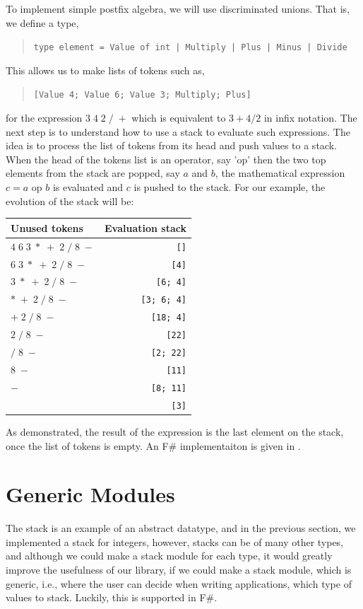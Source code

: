 \documentclass[fsharpNotes.tex]{subfiles}
\begin{document}
To implement simple postfix algebra, we will use discriminated unions. That is, we define a type,
\begin{quote}
\lstinline{type element = Value of int | Multiply | Plus | Minus | Divide}
\end{quote}
This allows us to make lists of tokens such as,
\begin{quote}
\lstinline{[Value 4; Value 6; Value 3; Multiply; Plus]}
\end{quote}
for the expression $3\; 4\; 2\; /\; +$ which is equivalent to $3+4/2$ in infix notation. The next step is to understand how to use a stack to evaluate such expressions. The idea is to process the list of tokens from its head and push values to a stack. When the head of the tokens list is an operator, say 'op' then the two top elements from the stack are popped, say $a$ and $b$, the mathematical expression $c = a\text{ op }b$ is evaluated and $c$ is pushed to the stack. For our example, the evolution of the stack will be:
\begin{center}
  \begin{tabular}{l|r}
  Unused tokens &  Evaluation stack\\\hline
  $4\; 6\; 3\; *\; +\; 2\; /\; 8\; -$ & \lstinline![]! \\
  $6\; 3\; *\; +\; 2\; /\; 8\; -$ & \lstinline![4]! \\
  $3\; *\; +\; 2\; /\; 8\; -$ & \lstinline![6; 4]! \\
  $*\; +\; 2\; /\; 8\; -$ & \lstinline![3; 6; 4]! \\
  $+\; 2\; /\; 8\; -$ & \lstinline![18; 4]! \\
  $2\; /\; 8\; -$ & \lstinline![22]! \\
  $/\; 8\; -$ & \lstinline![2; 22]! \\
  $8\; -$ & \lstinline![11]! \\
  $-$ & \lstinline![8; 11]! \\
   & \lstinline![3]! \\
\end{tabular}
\end{center}
As demonstrated, the result of the expression is the last element on the stack, once the list of tokens is empty. An F\# implementaiton is given in .

\section{Generic Modules}
\label{sec:genericModule}
The stack is an example of an abstract datatype, and in the previous section, we implemented a stack for integers, however, stacks can be of many other types, and although we could make a stack module for each type, it would greatly improve the usefulness of our library, if we could make a stack module, which is generic, i.e., where the user can decide when writing applications, which type of values to stack. Luckily, this is supported in F\#.
\end{document}
